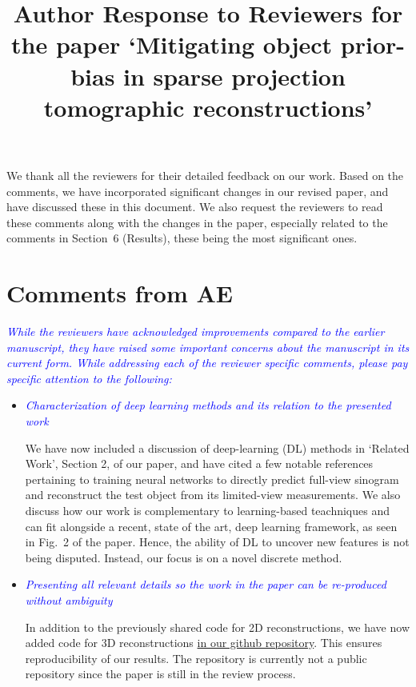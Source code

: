 \documentclass[11pt]{article}
\title{Author Response to Reviewers for the paper `Mitigating object
  prior-bias in sparse projection tomographic reconstructions'}
\begin{document}
\date{}
\maketitle


We thank all the reviewers for their detailed feedback on our
work. Based on the comments, we have incorporated significant changes
in our revised paper, and have discussed these in this document. We
also request the reviewers to read these comments along with the
changes in the paper, especially related to the comments in Section~6
(Results), these being the most significant ones.


\section{Comments from AE}

\textcolor{blue}{\textit{While the reviewers have acknowledged
    improvements compared to the earlier manuscript, they have raised
    some important concerns about the manuscript in its current
    form. While addressing each of the reviewer specific comments,
    please pay specific attention to the following:}} 

  \begin{itemize}
  \item \textcolor{blue}{\textit{Characterization of deep learning
        methods and its relation to the presented work}} 

    We have now included a discussion of deep-learning (DL) methods in
    `Related Work', Section 2, of our paper, and have cited a few
    notable references pertaining to training neural networks to
    directly predict full-view sinogram and reconstruct the test
    object from its limited-view measurements. We also discuss how our
    work is complementary to learning-based teachniques and can fit
    alongside a recent, state of the art, deep learning framework, as
    seen in Fig.~2 of the paper. Hence, the ability of DL to uncover
    new features is not being disputed. Instead, our focus is on a
    novel discrete method.
    

    \item\textcolor{blue}{\textit{Presenting all relevant details so
          the work in the paper can be re-produced without ambiguity}} 
      

      In addition to the previously shared code for 2D
      reconstructions, we have now added code for 3D reconstructions
      \href{https://github.com/preetigopal/Weighted-Prior-Tomographic-Reconstruction}{in
        our github repository}. This ensures reproducibility of our
      results. The repository is currently not a public repository
      since the paper is still in the review process.

  \end{itemize}
\end{document}
